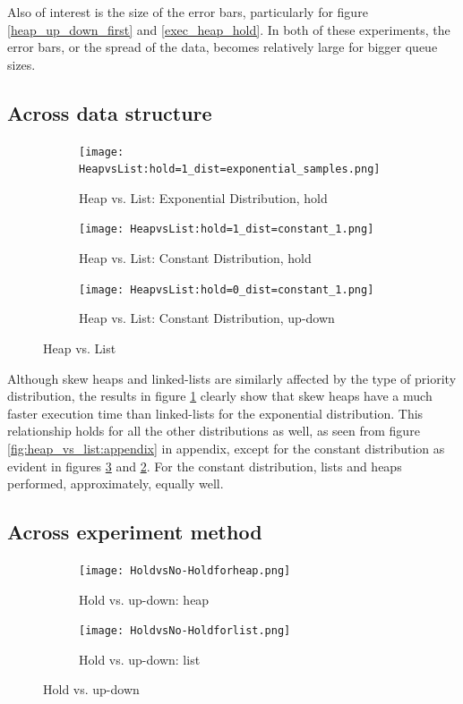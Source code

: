 \documentclass{article}
\begin{document}
Also of interest is the size of the error bars, particularly for figure \ref{heap_up_down_first} and \ref{exec_heap_hold}. In both of these experiments, the error bars, or the spread of the data, becomes relatively large for bigger queue sizes.

\subsection{Across data structure}
\begin{figure}[H]
\centering
    \begin{subfigure}[H]{0.4\linewidth}
    \texttt{[image: HeapvsList:hold=1\_dist=exponential\_samples.png]}
    \caption{Heap vs. List: Exponential Distribution, hold}
    \label{fig:heap_vs_list_expo}
    \end{subfigure}
    \begin{subfigure}[H]{0.4\linewidth}
    \texttt{[image: HeapvsList:hold=1\_dist=constant\_1.png]}
    \caption{Heap vs. List: Constant Distribution, hold}
    \label{fig:heap_vs_list_const_hold}
    \end{subfigure}
    \begin{subfigure}[H]{0.4\linewidth}
    \texttt{[image: HeapvsList:hold=0\_dist=constant\_1.png]}
    \caption{Heap vs. List: Constant Distribution, up-down}
    \label{fig:heap_vs_list_const}
    \end{subfigure}
\caption{Heap vs. List}
\label{fig:heap_vs_list}
\end{figure}

Although skew heaps and linked-lists are similarly affected by the type of priority distribution, the results in figure \ref{fig:heap_vs_list_expo} clearly show that skew heaps have a much faster execution time than linked-lists for the exponential distribution. This relationship holds for all the other distributions as well, as seen from figure \ref{fig:heap_vs_list:appendix} in appendix, except for the constant distribution as evident in figures \ref{fig:heap_vs_list_const} and \ref{fig:heap_vs_list_const_hold}. For the constant distribution, lists and heaps performed, approximately, equally well.

\subsection{Across experiment method}
\begin{figure}[H]
\centering
    \begin{subfigure}[H]{0.4\linewidth}
    \texttt{[image: HoldvsNo-Holdforheap.png]}
    \caption{Hold vs. up-down: heap}
    \label{}
    \end{subfigure}
    \begin{subfigure}[H]{0.4\linewidth}
    \texttt{[image: HoldvsNo-Holdforlist.png]}
    \caption{Hold vs. up-down: list}
    \label{}
    \end{subfigure}
\caption{Hold vs. up-down}
\label{fig:hold_vs_no_hold}
\end{figure}
\end{document}
